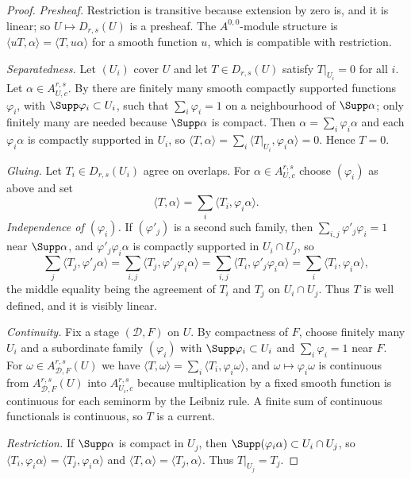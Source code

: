 \begin{proof}
\emph{Presheaf.}  Restriction is transitive because extension by zero is, and
it is linear; so $U\mapsto D_{r,s}(U)$ is a presheaf.  The $A^{0,0}$-module
structure is $\langle uT,\alpha\rangle=\langle T,u\alpha\rangle$ for a smooth
function $u$, which is compatible with restriction.

\emph{Separatedness.}  Let $(U_i)$ cover $U$ and let $T\in D_{r,s}(U)$ satisfy
$T|_{U_i}=0$ for all $i$.  Let $\alpha\in A_{U,c}^{r,s}$.  By
\cite[Corollary~15.2.9]{CLD25} there are finitely many smooth compactly
supported functions $\varphi_i$, with $\Supp\varphi_i\subset U_i$, such that
$\sum_i\varphi_i=1$ on a neighbourhood of $\Supp\alpha$; only finitely many
are needed because $\Supp\alpha$ is compact.  Then
$\alpha=\sum_i\varphi_i\alpha$ and each $\varphi_i\alpha$ is compactly
supported in $U_i$, so $\langle T,\alpha\rangle=\sum_i\langle
T|_{U_i},\varphi_i\alpha\rangle=0$.  Hence $T=0$.

\emph{Gluing.}  Let $T_i\in D_{r,s}(U_i)$ agree on overlaps.  For
$\alpha\in A_{U,c}^{r,s}$ choose $(\varphi_i)$ as above and set
\[
 \langle T,\alpha\rangle=\sum_i\langle T_i,\varphi_i\alpha\rangle .
\]
\emph{Independence of $(\varphi_i)$.}  If $(\varphi'_j)$ is a second such
family, then $\sum_{i,j}\varphi'_j\varphi_i=1$ near $\Supp\alpha$, and
$\varphi'_j\varphi_i\alpha$ is compactly supported in $U_i\cap U_j$, so
\[
 \sum_j\langle T_j,\varphi'_j\alpha\rangle
 =\sum_{i,j}\langle T_j,\varphi'_j\varphi_i\alpha\rangle
 =\sum_{i,j}\langle T_i,\varphi'_j\varphi_i\alpha\rangle
 =\sum_i\langle T_i,\varphi_i\alpha\rangle,
\]
the middle equality being the agreement of $T_i$ and $T_j$ on
$U_i\cap U_j$.  Thus $T$ is well defined, and it is visibly linear.

\emph{Continuity.}  Fix a stage $(\mathscr D,F)$ on $U$.  By compactness of
$F$, choose finitely many $U_i$ and a subordinate family $(\varphi_i)$ with
$\Supp\varphi_i\subset U_i$ and $\sum_i\varphi_i=1$ near $F$.  For
$\omega\in A^{r,s}_{\mathscr D,F}(U)$ we have
$\langle T,\omega\rangle=\sum_i\langle T_i,\varphi_i\omega\rangle$, and
$\omega\mapsto\varphi_i\omega$ is continuous from $A^{r,s}_{\mathscr D,F}(U)$
into $A_{U_i,c}^{r,s}$ because multiplication by a fixed smooth function is
continuous for each seminorm by the Leibniz rule.  A finite sum of continuous
functionals is continuous, so $T$ is a current.

\emph{Restriction.}  If $\Supp\alpha$ is compact in $U_j$, then
$\Supp(\varphi_i\alpha)\subset U_i\cap U_j$, so
$\langle T_i,\varphi_i\alpha\rangle=\langle T_j,\varphi_i\alpha\rangle$ and
$\langle T,\alpha\rangle=\langle T_j,\alpha\rangle$.  Thus $T|_{U_j}=T_j$.


\end{proof}
